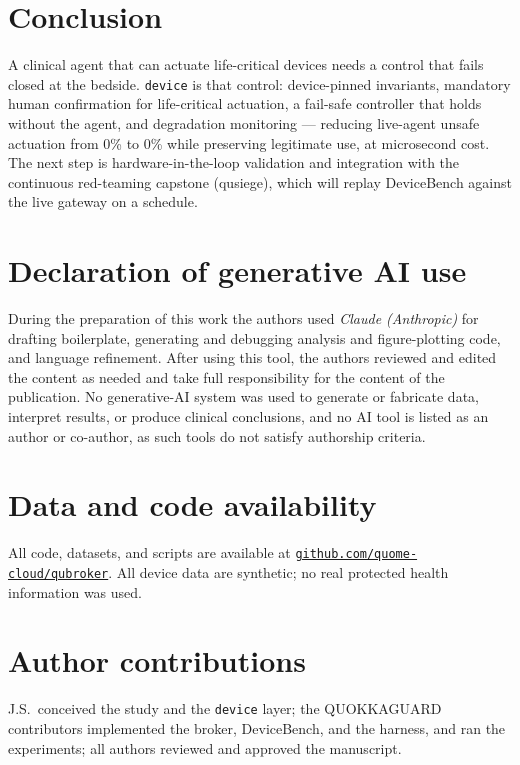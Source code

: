 \documentclass[11pt]{article}
\providecommand{\EoneUarOff}{0\%}
\providecommand{\EoneUarOn}{0\%}
\begin{document}
\section{Conclusion}
A clinical agent that can actuate life-critical devices needs a control that fails
closed at the bedside. \texttt{device} is that control: device-pinned invariants,
mandatory human confirmation for life-critical actuation, a fail-safe controller
that holds without the agent, and degradation monitoring --- reducing live-agent
unsafe actuation from \EoneUarOff{} to \EoneUarOn{} while preserving legitimate
use, at microsecond cost. The next step is hardware-in-the-loop validation and
integration with the continuous red-teaming capstone (qusiege), which will replay
DeviceBench against the live gateway on a schedule.

\section*{Declaration of generative AI use}
During the preparation of this work the authors used \emph{Claude (Anthropic)} for
drafting boilerplate, generating and debugging analysis and figure-plotting code,
and language refinement. After using this tool, the authors reviewed and edited
the content as needed and take full responsibility for the content of the
publication. No generative-AI system was used to generate or fabricate data,
interpret results, or produce clinical conclusions, and no AI tool is listed as an
author or co-author, as such tools do not satisfy authorship criteria.

\section*{Data and code availability}
All code, datasets, and scripts are available at
\href{https://github.com/quome-cloud/qubroker}{\nolinkurl{github.com/quome-cloud/qubroker}}.
All device data are synthetic; no real protected health information was used.

\section*{Author contributions}
J.S.\ conceived the study and the \texttt{device} layer; the QUOKKAGUARD
contributors implemented the broker, DeviceBench, and the harness, and ran the
experiments; all authors reviewed and approved the manuscript.
\end{document}
